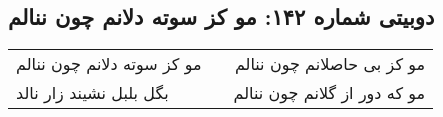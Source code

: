 \begin{center}
\section*{دوبیتی شماره ۱۴۲: مو کز سوته دلانم چون ننالم}
\label{sec:142}
\begin{longtable}{l p{0.5cm} r}
مو کز سوته دلانم چون ننالم
&&
مو کز بی حاصلانم چون ننالم
\\
بگل بلبل نشیند زار نالد
&&
مو که دور از گلانم چون ننالم
\\
\end{longtable}
\end{center}
